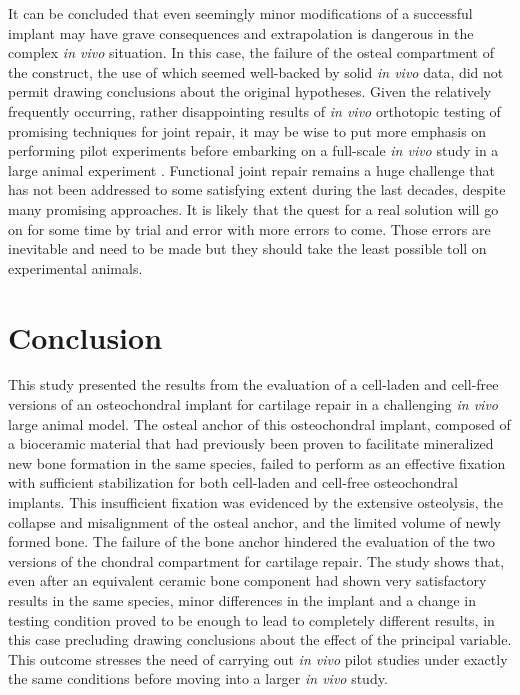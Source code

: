 \documentclass[twocolumn, serif, empirical, authordate, seplic]{jote-article}
\begin{document}
It can be concluded that even seemingly minor modifications of a successful implant may have grave consequences and extrapolation is dangerous in the complex \emph{in vivo} situation. In this case, the failure of the osteal compartment of the construct, the use of which seemed well-backed by solid \emph{in vivo} data, did not permit drawing conclusions about the original hypotheses. Given the relatively frequently occurring, rather disappointing results of \emph{in vivo}
orthotopic testing of promising techniques for joint repair, it may be wise to put more emphasis on performing pilot experiments before embarking on a full-scale \emph{in vivo} study in a large animal experiment \parencite{VindasBolanos2017}. Functional joint repair remains a huge challenge that has not been addressed to some satisfying extent during the last decades, despite many promising approaches. It is likely that the quest for a real solution will go on for some time by trial and error with more errors to come. Those errors are inevitable and need to be made but they should take the least possible toll on experimental animals.

 {}\section*{Conclusion} 

This study presented the results from the evaluation of a cell-laden and cell-free versions of an osteochondral implant for cartilage repair in a challenging \emph{in vivo} large animal model. The osteal anchor of this osteochondral implant, composed of a bioceramic material that had previously been proven to facilitate mineralized new bone formation in the same species, failed to perform as an effective fixation with sufficient stabilization for both cell-laden and cell-free osteochondral implants. This insufficient fixation was evidenced by the extensive osteolysis, the collapse and misalignment of the osteal anchor, and the limited volume of newly formed bone. The failure of the bone anchor hindered the evaluation of the two versions of the chondral compartment for cartilage repair. The study shows that, even after an equivalent ceramic bone component had shown very satisfactory results in the same species, minor differences in the implant and a change in testing condition proved to be enough to lead to completely different results, in this case precluding drawing conclusions about the effect of the principal variable. This outcome stresses the need of carrying out \emph{in vivo} pilot studies under exactly the same conditions before moving into a larger \emph{in vivo} study.
\end{document}
